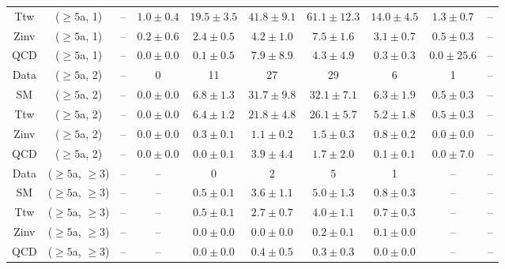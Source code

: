 \begin{table}[h!]
{\begin{tabular}{cccccccccc}
	Ttw & ($\ge5$a, 1) & -- & $1.0\pm 0.4$ & $19.5\pm 3.5$ & $41.8\pm 9.1$ & $61.1\pm 12.3$ & $14.0\pm 4.5$ & $1.3\pm 0.7$ & -- \\[0.5ex] 
	Zinv & ($\ge5$a, 1) & -- & $0.2\pm 0.6$ & $2.4\pm 0.5$ & $4.2\pm 1.0$ & $7.5\pm 1.6$ & $3.1\pm 0.7$ & $0.5\pm 0.3$ & -- \\[0.5ex] 
	QCD & ($\ge5$a, 1) & -- & $0.0\pm 0.0$ & $0.1\pm 0.5$ & $7.9\pm 8.9$ & $4.3\pm 4.9$ & $0.3\pm 0.3$ & $0.0\pm 25.6$ & -- \\[0.5ex] 
	Data & ($\ge5$a, 2) & -- & 0 & 11 & 27 & 29 & 6 & 1 & -- \\[0.5ex] 
	SM & ($\ge5$a, 2) & -- & $0.0\pm 0.0$ & $6.8\pm 1.3$ & $31.7\pm 9.8$ & $32.1\pm 7.1$ & $6.3\pm 1.9$ & $0.5\pm 0.3$ & -- \\[0.5ex] 
	Ttw & ($\ge5$a, 2) & -- & $0.0\pm 0.0$ & $6.4\pm 1.2$ & $21.8\pm 4.8$ & $26.1\pm 5.7$ & $5.2\pm 1.8$ & $0.5\pm 0.3$ & -- \\[0.5ex] 
	Zinv & ($\ge5$a, 2) & -- & $0.0\pm 0.0$ & $0.3\pm 0.1$ & $1.1\pm 0.2$ & $1.5\pm 0.3$ & $0.8\pm 0.2$ & $0.0\pm 0.0$ & -- \\[0.5ex] 
	QCD & ($\ge5$a, 2) & -- & $0.0\pm 0.0$ & $0.0\pm 0.1$ & $3.9\pm 4.4$ & $1.7\pm 2.0$ & $0.1\pm 0.1$ & $0.0\pm 7.0$ & -- \\[0.5ex] 
	Data & ($\ge5$a, $\ge3$) & -- & -- & 0 & 2 & 5 & 1 & -- & -- \\[0.5ex] 
	SM & ($\ge5$a, $\ge3$) & -- & -- & $0.5\pm 0.1$ & $3.6\pm 1.1$ & $5.0\pm 1.3$ & $0.8\pm 0.3$ & -- & -- \\[0.5ex] 
	Ttw & ($\ge5$a, $\ge3$) & -- & -- & $0.5\pm 0.1$ & $2.7\pm 0.7$ & $4.0\pm 1.1$ & $0.7\pm 0.3$ & -- & -- \\[0.5ex] 
	Zinv & ($\ge5$a, $\ge3$) & -- & -- & $0.0\pm 0.0$ & $0.0\pm 0.0$ & $0.2\pm 0.1$ & $0.1\pm 0.0$ & -- & -- \\[0.5ex] 
	QCD & ($\ge5$a, $\ge3$) & -- & -- & $0.0\pm 0.0$ & $0.4\pm 0.5$ & $0.3\pm 0.3$ & $0.0\pm 0.0$ & -- & -- \\[0.5ex] 
	\hline
	\hline
\end{tabular}}
\end{table}
